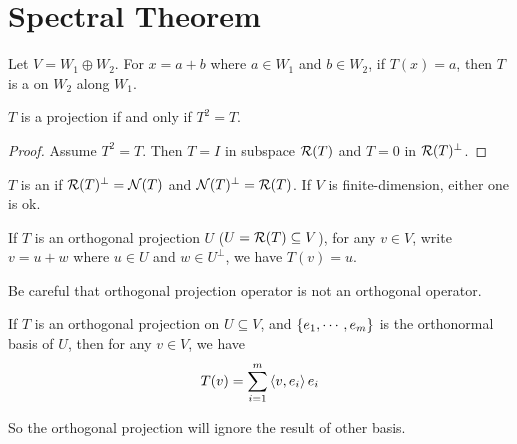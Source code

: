 \section{Spectral Theorem}

\begin{definition}[Projection]
    Let $V = W_1 \oplus W_2$. For $x = a + b$ where $a \in W_1$ and $b \in W_2$, if $T(x) = a$, then $T$ is a  on $W_2$ along $W_1$.
\end{definition}


\begin{theorem}
    $T$ is a projection if and only if $T^2 = T$.    
\end{theorem}
\begin{proof}
    Assume $T^2 = T$. Then $T=I$ in subspace $\mathcal{R}(T)$ and $T = 0$ in $\mathcal{R}(T)^\perp$.
\end{proof}

\begin{definition}
    $T$ is an  if $\mathcal{R}(T)^\perp = \mathcal{N}(T)$ and $\mathcal{N}(T)^\perp = \mathcal{R}(T)$. If $V$ is finite-dimension, either one is ok.
    
    If $T$ is an orthogonal projection $U$ ($U = \mathcal{R}(T) \subseteq V$), for any $v \in V$, write $v = u + w$ where $u \in U$ and $w \in U^\perp$, we have $T(v) = u$.
\end{definition}

Be careful that orthogonal projection operator is not an orthogonal operator.

\begin{theorem}
    If $T$ is an orthogonal projection on $U \subseteq V$, and $\set{e_1, \cdots, e_m}$ is the orthonormal basis of $U$, then for any $v \in V$, we have
    \begin{equation}
        T(v) = \sum_{i=1}^{m} \left\langle \displaystyle v, e_i \right\rangle e_i
    \end{equation}
    
    So the orthogonal projection will ignore the result of other basis.
\end{theorem}



